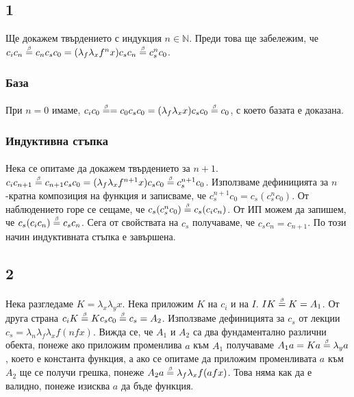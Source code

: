 \documentclass[12pt]{article}
\begin{document}
\subsection*{1}
Ще докажем твърдението с индукция $n \in \mathbb{N}$. Преди това ще забележим, че $c_i c_n \betaeq c_n c_s c_0 = (\lambda_f \lambda_x f^n x) c_s c_n \betaeq c_s^n c_0 $.
\subsubsection*{База}
\paragraph*{}
При $n=0$ имаме, $c_i c_0 \betaeq = c_0 c_s c_0 = (\lambda_f \lambda_x x) c_s c_0 \betaeq c_0$, с което базата е доказана.

\subsubsection*{Индуктивна стъпка}
\paragraph*{}
Нека се опитаме да докажем твърдението за $n+1$. $c_i c_{n+1} \betaeq c_{n+1} c_s c_0 = (\lambda_f \lambda_x f^{n+1} x) c_s c_0 \betaeq c_s^{n+1} c_0$. Използваме дефиницията за $n$-кратна композиция на функция и записваме, че $c_s^{n+1} c_0 = c_s (c_s^n c_0)$. От наблюдението горе се сещаме, че $c_s (c_s^n c_0) \betaeq c_s (c_i c_n)$. От ИП можем да запишем, че $c_s (c_i c_n) \betaeq c_s c_n$. Сега от свойствата на $c_s$ получаваме, че $c_s c_n = c_{n+1}$. По този начин индуктивната стъпка е завършена.

\subsection*{2}
\paragraph*{}
Нека разгледаме $K = \lambda_x \lambda_y x$. Нека приложим $K$ на $c_i$ и на $I$. $I K \betaeq K = A_1$. От друга страна $c_i K \betaeq K c_s c_0 \betaeq c_s = A_2$. Използваме дефиницията за $c_s$ от лекции $c_s = \lambda_n \lambda_f \lambda_x f (n f x)$. Вижда се, че $A_1$ и $A_2$ са два фундаментално различни обекта, понеже ако приложим променлива $a$ към $A_1$ получаваме $A_1 a = Ka \betaeq \lambda_y a$, което е константа функция, а ако се опитаме да приложим променливата $a$ към $A_2$ ще се получи грешка, понеже $A_2 a \betaeq \lambda_f \lambda_x f(afx)$. Това няма как да е валидно, понеже изисква $a$ да бъде функция.
\end{document}
